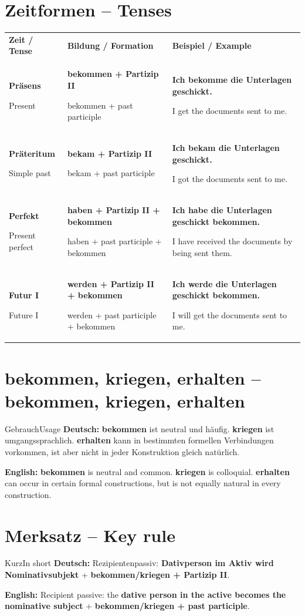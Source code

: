 \documentclass[a4paper,11pt]{article}
\newcommand{\GermanText}[1]{\textbf{Deutsch: }#1\par}
\newcommand{\EnglishText}[1]{{\small\color{SoftGray}\textbf{English: }#1\par}}
\newcommand{\DEEN}[2]{\textbf{#1}\par{\footnotesize\color{SoftGray}#2}}
\begin{document}
\section{Zeitformen -- Tenses}
\begin{longtable}{>{\bfseries}p{3.0cm}|p{5.2cm}|p{5.6cm}}
\rowcolor{HeaderBlueDark}\color{white}\textbf{Zeit / Tense}&\color{white}\textbf{Bildung / Formation}&\color{white}\textbf{Beispiel / Example}\\
\DEEN{Präsens}{Present}&\DEEN{bekommen + Partizip II}{bekommen + past participle}&\DEEN{Ich bekomme die Unterlagen geschickt.}{I get the documents sent to me.}\\
\DEEN{Präteritum}{Simple past}&\DEEN{bekam + Partizip II}{bekam + past participle}&\DEEN{Ich bekam die Unterlagen geschickt.}{I got the documents sent to me.}\\
\DEEN{Perfekt}{Present perfect}&\DEEN{haben + Partizip II + bekommen}{haben + past participle + bekommen}&\DEEN{Ich habe die Unterlagen geschickt bekommen.}{I have received the documents by being sent them.}\\
\DEEN{Futur I}{Future I}&\DEEN{werden + Partizip II + bekommen}{werden + past participle + bekommen}&\DEEN{Ich werde die Unterlagen geschickt bekommen.}{I will get the documents sent to me.}\\
\end{longtable}

\section{bekommen, kriegen, erhalten -- bekommen, kriegen, erhalten}
\begin{grammarentry}{Gebrauch}{Usage}
\GermanText{\textbf{bekommen} ist neutral und häufig. \textbf{kriegen} ist umgangssprachlich. \textbf{erhalten} kann in bestimmten formellen Verbindungen vorkommen, ist aber nicht in jeder Konstruktion gleich natürlich.}
\EnglishText{\textbf{bekommen} is neutral and common. \textbf{kriegen} is colloquial. \textbf{erhalten} can occur in certain formal constructions, but is not equally natural in every construction.}
\end{grammarentry}

\section{Merksatz -- Key rule}
\begin{grammarentry}{Kurz}{In short}
\GermanText{Rezipientenpassiv: \textbf{Dativperson im Aktiv wird Nominativsubjekt} + \textbf{bekommen/kriegen + Partizip II}.}
\EnglishText{Recipient passive: the \textbf{dative person in the active becomes the nominative subject} + \textbf{bekommen/kriegen + past participle}.}
\end{grammarentry}
\end{document}
